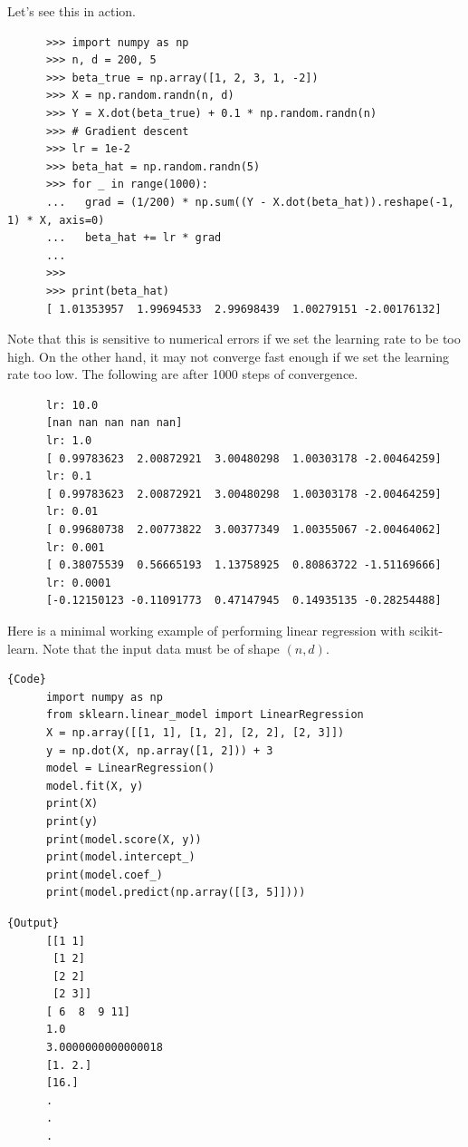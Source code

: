   \begin{example}
    \label{ex:sgd-from-scratch}
    Let's see this in action. 

    \begin{lstlisting}
      >>> import numpy as np 
      >>> n, d = 200, 5
      >>> beta_true = np.array([1, 2, 3, 1, -2])
      >>> X = np.random.randn(n, d)
      >>> Y = X.dot(beta_true) + 0.1 * np.random.randn(n)
      >>> # Gradient descent 
      >>> lr = 1e-2
      >>> beta_hat = np.random.randn(5)
      >>> for _ in range(1000): 
      ...   grad = (1/200) * np.sum((Y - X.dot(beta_hat)).reshape(-1, 1) * X, axis=0)
      ...   beta_hat += lr * grad  
      ... 
      >>> 
      >>> print(beta_hat)
      [ 1.01353957  1.99694533  2.99698439  1.00279151 -2.00176132]
    \end{lstlisting}

    Note that this is sensitive to numerical errors if we set the learning rate to be too high. On the other hand, it may not converge fast enough if we set the learning rate too low. The following are after 1000 steps of convergence. 

    \begin{lstlisting}
      lr: 10.0
      [nan nan nan nan nan]
      lr: 1.0
      [ 0.99783623  2.00872921  3.00480298  1.00303178 -2.00464259]
      lr: 0.1
      [ 0.99783623  2.00872921  3.00480298  1.00303178 -2.00464259]
      lr: 0.01
      [ 0.99680738  2.00773822  3.00377349  1.00355067 -2.00464062]
      lr: 0.001
      [ 0.38075539  0.56665193  1.13758925  0.80863722 -1.51169666]
      lr: 0.0001
      [-0.12150123 -0.11091773  0.47147945  0.14935135 -0.28254488]
    \end{lstlisting}
  \end{example}

  \begin{code}
    Here is a minimal working example of performing linear regression with scikit-learn. Note that the input data must be of shape $(n, d)$. 

    \noindent\begin{minipage}{.6\textwidth}
    \begin{lstlisting}[]{Code}
      import numpy as np 
      from sklearn.linear_model import LinearRegression 
      X = np.array([[1, 1], [1, 2], [2, 2], [2, 3]]) 
      y = np.dot(X, np.array([1, 2])) + 3 
      model = LinearRegression()  
      model.fit(X, y) 
      print(X) 
      print(y)
      print(model.score(X, y))  
      print(model.intercept_)
      print(model.coef_) 
      print(model.predict(np.array([[3, 5]])))
    \end{lstlisting}
    \end{minipage}
    \hfill
    \begin{minipage}{.39\textwidth}
    \begin{lstlisting}[]{Output}
      [[1 1]
       [1 2]
       [2 2]
       [2 3]]
      [ 6  8  9 11]
      1.0
      3.0000000000000018
      [1. 2.]
      [16.]
      .
      .
      .
    \end{lstlisting}
    \end{minipage}
  \end{code}

